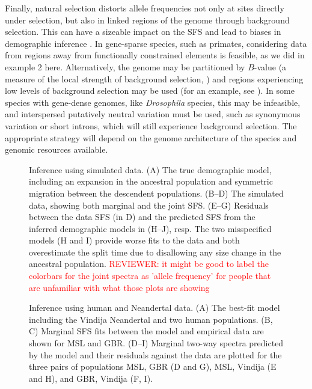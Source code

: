 \documentclass[]{article}
\newcommand{\reviewercomment}[1]{{\textcolor{red}{REVIEWER: #1}}}
\begin{document}
Finally, natural selection distorts allele frequencies not only at sites
directly under selection, but also in linked regions of the genome through
background selection. This can have a sizeable impact on the SFS and lead to
biases in demographic inference \cite{ewing2016consequences, johri2021impact}.
In gene-sparse species, such as primates, considering data from regions away
from functionally constrained elements is feasible, as we did in example 2
here.  Alternatively, the genome may be partitioned by $B$-value (a measure of
the local strength of background selection, \cite{mcvicker2009widespread}) and
regions experiencing low levels of background selection may be used (for an
example, see \cite{medina2023demographic}). In some species with gene-dense
genomes, like \emph{Drosophila} species, this may be infeasible, and
interspersed putatively neutral variation must be used, such as synonymous
variation or short introns, which will still experience background selection.
The appropriate strategy will depend on the genome architecture of the species
and genomic resources available.





\clearpage

\begin{figure}
    \caption{
        Inference using simulated data. (A) The true demographic model,
        including an expansion in the ancestral population and symmetric
        migration between the descendent populations. (B--D) The simulated
        data, showing both marginal and the joint SFS. (E--G) Residuals
        between the data SFS (in D) and the predicted SFS from the inferred
        demographic models in (H--J), resp.  The two misspecified models (H and
        I) provide worse fits to the data and both overestimate the split time
        due to disallowing any size change in the ancestral population.
        \reviewercomment{it might be good to label the colorbars for the joint spectra as 'allele frequency' for people that are unfamiliar with what those plots are showing}
    }
    \label{fig:im}
\end{figure}

\begin{figure}
    \caption{
        Inference using human and Neandertal data.
        (A) The best-fit model including the Vindija Neandertal and two human
        populations.
        (B, C) Marginal SFS fits between the model and empirical data are shown
        for MSL and GBR.
        (D--I) Marginal two-way spectra predicted by the model and their residuals 
        against the data are plotted for the three pairs of populations MSL, GBR 
        (D and G), MSL, Vindija (E and H), and GBR, Vindija (F, I).
    }
    \label{fig:humans}
\end{figure}
\end{document}
